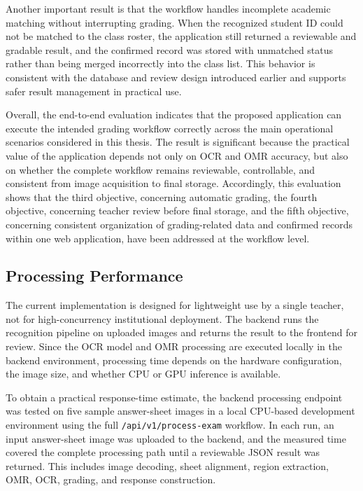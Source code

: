 \documentclass[../Main.tex]{subfiles}
\begin{document}
Another important result is that the workflow handles incomplete academic
matching without interrupting grading. When the recognized student ID could not
be matched to the class roster, the application still returned a reviewable and
gradable result, and the confirmed record was stored with unmatched status
rather than being merged incorrectly into the class list. This behavior is
consistent with the database and review design introduced earlier and supports
safer result management in practical use.

Overall, the end-to-end evaluation indicates that the proposed application can
execute the intended grading workflow correctly across the main operational
scenarios considered in this thesis. The result is significant because the
practical value of the application depends not only on OCR and OMR accuracy,
but also on whether the complete workflow remains reviewable, controllable, and
consistent from image acquisition to final storage. Accordingly, this
evaluation shows that the third objective, concerning automatic grading, the
fourth objective, concerning teacher review before final storage, and the fifth
objective, concerning consistent organization of grading-related data and
confirmed records within one web application, have been addressed at the
workflow level.

\subsection{Processing Performance}
\label{subsection:4.3.4}

The current implementation is designed for lightweight use by a single teacher,
not for high-concurrency institutional deployment. The backend runs the
recognition pipeline on uploaded images and returns the result to the frontend
for review. Since the OCR model and OMR processing are executed locally in the
backend environment, processing time depends on the hardware configuration, the
image size, and whether CPU or GPU inference is available.

To obtain a practical response-time estimate, the backend processing endpoint
was tested on five sample answer-sheet images in a local CPU-based development
environment using the full
\texttt{/api/v1/process-exam} workflow. In each run, an input answer-sheet image
was uploaded to the backend, and the measured time covered the complete
processing path until a reviewable JSON result was returned. This includes image
decoding, sheet alignment, region extraction, OMR, OCR, grading, and response
construction.
\end{document}

